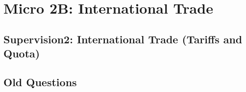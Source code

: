 %
%
%
%
%
%
%
%
%
%
%
%
%
%
%
%
%
%
%
%
%
%
%
%
%
%





 \frontmatter
 \maketitle
 \tableofcontents
 \mainmatter


\part{Micro 2B: International Trade}
%


% 


\chapter*{Supervision2: International Trade (Tariffs and Quota)}



\chapter*{Old Questions}









\newpage

\backmatter
%
%
\printindex




 
 

